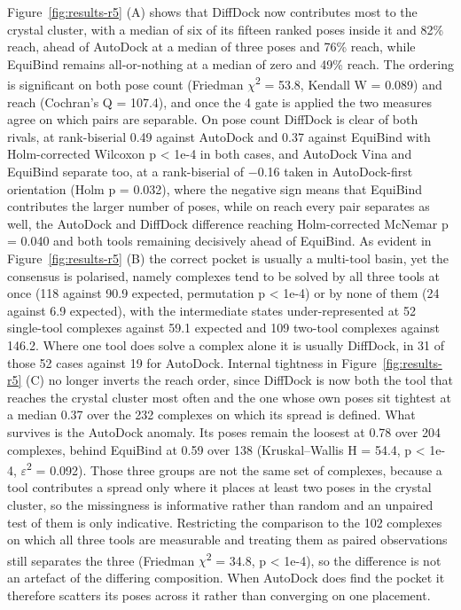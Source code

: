 Figure~\ref{fig:results-r5} (A) shows that DiffDock now contributes most to the crystal cluster, with a median of six of its fifteen ranked poses inside it and 82\% reach, ahead of AutoDock at a median of three poses and 76\% reach, while EquiBind remains all-or-nothing at a median of zero and 49\% reach. The ordering is significant on both pose count (Friedman \ensuremath{\chi}\textsuperscript{2} = 53.8, Kendall W = 0.089) and reach (Cochran's Q = 107.4), and once the 4 \angstrom{} gate is applied the two measures agree on which pairs are separable. On pose count DiffDock is clear of both rivals, at rank-biserial 0.49 against AutoDock and 0.37 against EquiBind with Holm-corrected Wilcoxon p \textless{} 1e-4 in both cases, and AutoDock Vina and EquiBind separate too, at a rank-biserial of \ensuremath{-}0.16 taken in AutoDock-first orientation (Holm p = 0.032), where the negative sign means that EquiBind contributes the larger number of poses, while on reach every pair separates as well, the AutoDock and DiffDock difference reaching Holm-corrected McNemar p = 0.040 and both tools remaining decisively ahead of EquiBind. As evident in Figure~\ref{fig:results-r5} (B) the correct pocket is usually a multi-tool basin, yet the consensus is polarised, namely complexes tend to be solved by all three tools at once (118 against 90.9 expected, permutation p \textless{} 1e-4) or by none of them (24 against 6.9 expected), with the intermediate states under-represented at 52 single-tool complexes against 59.1 expected and 109 two-tool complexes against 146.2. Where one tool does solve a complex alone it is usually DiffDock, in 31 of those 52 cases against 19 for AutoDock. Internal tightness in Figure~\ref{fig:results-r5} (C) no longer inverts the reach order, since DiffDock is now both the tool that reaches the crystal cluster most often and the one whose own poses sit tightest at a median 0.37 \angstrom{} over the 232 complexes on which its spread is defined. What survives is the AutoDock anomaly. Its poses remain the loosest at 0.78 \angstrom{} over 204 complexes, behind EquiBind at 0.59 \angstrom{} over 138 (Kruskal--Wallis H = 54.4, p \textless{} 1e-4, \ensuremath{\varepsilon}\textsuperscript{2} = 0.092). Those three groups are not the same set of complexes, because a tool contributes a spread only where it places at least two poses in the crystal cluster, so the missingness is informative rather than random and an unpaired test of them is only indicative. Restricting the comparison to the 102 complexes on which all three tools are measurable and treating them as paired observations still separates the three (Friedman \ensuremath{\chi}\textsuperscript{2} = 34.8, p \textless{} 1e-4), so the difference is not an artefact of the differing composition. When AutoDock does find the pocket it therefore scatters its poses across it rather than converging on one placement.

